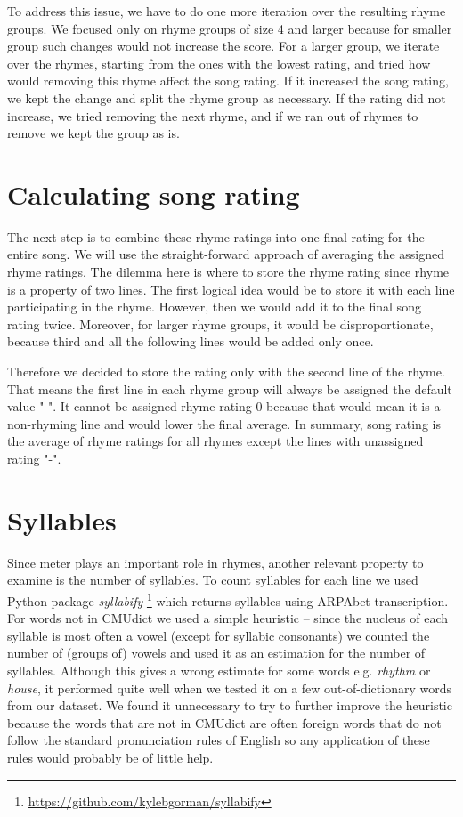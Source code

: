 To address this issue, we have to do one more iteration over the resulting rhyme groups. We focused only on rhyme groups of size 4 and larger because for smaller group such changes would not increase the score. For a larger group, we iterate over the rhymes, starting from the ones with the lowest rating, and tried how would removing this rhyme affect the song rating. If it increased the song rating, we kept the change and split the rhyme group as necessary. If the rating did not increase, we tried removing the next rhyme, and if we ran out of rhymes to remove we kept the group as is.

\section{Calculating song rating}
The next step is to combine these rhyme ratings into one final rating for the entire song. We will use the straight-forward approach of averaging the assigned rhyme ratings. The dilemma here is where to store the rhyme rating since rhyme is a property of two lines. The first logical idea would be to store it with each line participating in the rhyme. However, then we would add it to the final song rating twice. Moreover, for larger rhyme groups, it would be disproportionate, because third and all the following lines would be added only once. 

Therefore we decided to store the rating only with the second line of the rhyme. That means the first line in each rhyme group will always be assigned the default value "-". It cannot be assigned rhyme rating 0 because that would mean it is a non-rhyming line and would lower the final average. In summary, song rating is the average of rhyme ratings for all rhymes except the lines with unassigned rating "-".






	
\section{Syllables}
Since meter plays an important role in rhymes, another relevant property to examine is the number of syllables. To count syllables for each line we used Python package \textit{syllabify} \footnote{\url{https://github.com/kylebgorman/syllabify}} which returns syllables using ARPAbet transcription. For words not in CMUdict we used a simple heuristic -- since the nucleus of each syllable is most often a vowel (except for syllabic consonants) we counted the number of (groups of) vowels and used it as an estimation for the number of syllables. Although this gives a wrong estimate for some words e.g. \textit{rhythm} or \textit{house}, it performed quite well when we tested it on a few out-of-dictionary words from our dataset. We found it unnecessary to try to further improve the heuristic because the words that are not in CMUdict are often foreign words that do not follow the standard pronunciation rules of English so any application of these rules would probably be of little help.

